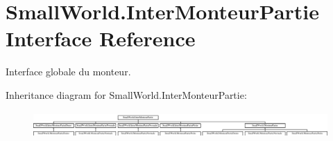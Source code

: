 \hypertarget{interface_small_world_1_1_inter_monteur_partie}{\section{Small\-World.\-Inter\-Monteur\-Partie Interface Reference}
\label{interface_small_world_1_1_inter_monteur_partie}
}


Interface globale du monteur.  


Inheritance diagram for Small\-World.\-Inter\-Monteur\-Partie\-:\begin{figure}[H]
\begin{center}
\leavevmode
\includegraphics[height=1.004184cm]{interface_small_world_1_1_inter_monteur_partie}
\end{center}
\end{figure}
